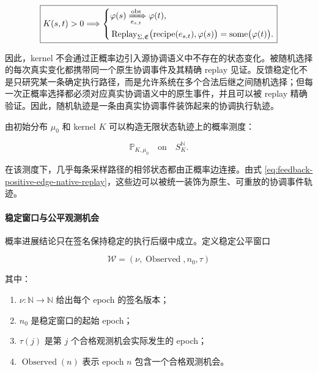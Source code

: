   \begin{equation}
    \boxed{
      K(s,t)>0
      \Longrightarrow
      \left\{
        \begin{aligned}
          &
          \varphi(s)
          \xRightarrow[e_{s,t}]{\mathrm{obs}}
          \varphi(t),
          \\
          &
          \operatorname{Replay}_{\Sigma,\mathfrak E}
          \bigl(
            \operatorname{recipe}(e_{s,t}),
            \varphi(s)
          \bigr)
          =
          \operatorname{some}\bigl(\varphi(t)\bigr).
        \end{aligned}
        \right.
      }
      \label{eq:feedback-positive-edge-native-replay}
    \end{equation}

    因此，kernel 不会通过正概率边引入源协调语义中不存在的状态变化。被随机选择的每次真实变化都携带同一个原生协调事件及其精确 replay 见证。反馈稳定化不是只研究某一条确定执行路径，而是允许系统在多个合法后继之间随机选择；但每一次正概率选择都必须对应真实协调语义中的原生事件，并且可以被 replay 精确验证。因此，随机轨迹是一条由真实协调事件装饰起来的协调执行轨迹。

    由初始分布 $\mu_0$ 和 kernel $K$ 可以构造无限状态轨迹上的概率测度：

    \begin{equation}
      \boxed{
        \mathbb P_{K,\mu_0}
        \quad\text{on}\quad
        S_K^{\mathbb N}.
      }
      \label{eq:feedback-trajectory-measure}
    \end{equation}

    在该测度下，几乎每条采样路径的相邻状态都由正概率边连接。由式
    \eqref{eq:feedback-positive-edge-native-replay}，这些边可以被统一装饰为原生、可重放的协调事件轨迹。

    \paragraph{稳定窗口与公平观测机会}

    概率进展结论只在签名保持稳定的执行后缀中成立。定义稳定公平窗口

    \begin{equation}
      \boxed{
        \mathcal W
        =
        (\nu,\operatorname{Observed},n_0,\tau)
      }
      \label{eq:feedback-stable-fair-window}
    \end{equation}

    其中：

    \begin{enumerate}
      \item $\nu:\mathbb N\rightarrow\mathbb N$ 给出每个 epoch 的签名版本；
      \item $n_0$ 是稳定窗口的起始 epoch；
      \item $\tau(j)$ 是第 $j$ 个合格观测机会实际发生的 epoch；
      \item $\operatorname{Observed}(n)$ 表示 epoch $n$ 包含一个合格观测机会。
    \end{enumerate}

